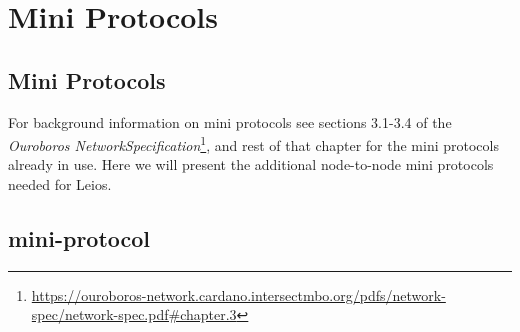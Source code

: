 \chapter{Mini Protocols}
\label{chapter:mini-protocols}

\newcommand{\Producer}{\textcolor{mygreen}{\textbf{Producer}}}
\newcommand{\Consumer}{\textcolor{myblue}{\textbf{Consumer}}}

\newcommand{\miniProtocolsUrl}{\url{https://ouroboros-network.cardano.intersectmbo.org/pdfs/network-spec/network-spec.pdf\#chapter.3}}
\section{Mini Protocols}
For background information on mini protocols see sections 3.1-3.4 of
the \emph{Ouroboros NetworkSpecification}\footnote{\miniProtocolsUrl},
and rest of that chapter for the mini protocols already in use. Here
we will present the additional node-to-node mini protocols needed for
Leios.

\newcommand{\miniEntry}[5]{
  \begin{framed}
      \noindent\textbf{#1}\hfill  Section \ref{#2}
      \newline {#3}
      \newline {\href{#5}{\small\texttt{#4}}}
  \end{framed}
}

\newcommand{\relay}{\text{Relay}}
\newcommand{\catchup}{\text{CatchUp}}
\newcommand{\fetch}{\text{Fetch}}

\section{\relay{} mini-protocol}
\label{ptcl:relay}

\newcommand{\StInit}  {\state{StInit}}
\newcommand{\MsgInit} {\msg{MsgInit}}
\newcommand{\StIdsBlocking}    {\state{StIdsBlocking}}
\newcommand{\StIdsNonBlocking} {\state{StIdsNonBlocking}}
\newcommand{\StData}              {\state{StData}}
\newcommand{\MsgRequestIdsNB}  {\msg{MsgRequestIdsNonBlocking}}
\newcommand{\MsgRequestIdsB}   {\msg{MsgRequestIdsBlocking}}
\newcommand{\MsgReplyIds}      {\msg{MsgReplyIds}}
\newcommand{\MsgReplyIdsAndAnns}  {\msg{MsgReplyIdsAndAnns}}
\newcommand{\MsgReplyIdsSlashAnns}  {\msg{MsgReplyIds\langle AndAnns\rangle}}
\newcommand{\MsgRequestData}      {\msg{MsgRequestData}}
\newcommand{\MsgReplyData}        {\msg{MsgReplyData}}
\newcommand{\option}[1]{\text{#1}}
\newcommand{\BoundedWindow} {\option{BoundedWindow}}
\newcommand{\Announcements} {\option{Announcements}}
\newcommand{\annCond}{\text{Ann. Condition}}
\newcommand{\info}{\text{info}}
\newcommand{\ann}{\text{ann}}
\newcommand{\ack}{\text{ack}}
\newcommand{\req}{\text{req}}
\newcommand{\id}{\text{id}}
\newcommand{\datum}{\text{datum}}
\newcommand{\parameter}{\text{parameter}}

